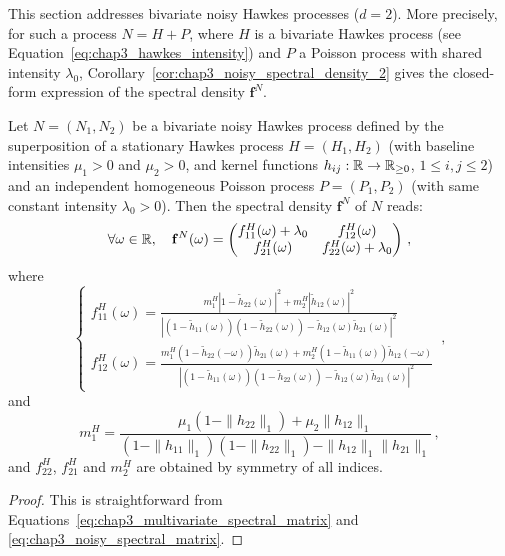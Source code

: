       This section addresses bivariate noisy Hawkes processes ($d=2$).
      More precisely, for such a process $N = H + P$, where $H$ is a bivariate Hawkes process (see Equation~\eqref{eq:chap3_hawkes_intensity}) and $P$ a Poisson process with shared intensity $\lambda_0$,
      Corollary~\ref{cor:chap3_noisy_spectral_density_2} gives the closed-form expression of the spectral density $\mathbf f^N$.
      \begin{corollary}\label{cor:chap3_noisy_spectral_density_2}
        Let $N = (N_1, N_2)$ be a bivariate noisy Hawkes process defined by the superposition of a stationary Hawkes process $H = (H_1, H_2)$
        (with baseline intensities $\mu_1 > 0$ and $\mu_2 > 0$, and kernel functions $h_{ij} : {\mathbb R} \to {\mathbb R}_{\geq 0}$, $1 \le i, j \le 2$)
        and an independent homogeneous Poisson process $P = (P_1, P_2)$ (with same constant intensity $\lambda_0 > 0$).
        Then the spectral density $\mathbf f^N$ of $N$ reads:
        \begin{equation*}
          \forall \omega \in {\mathbb R}, \quad
          \mathbf f^N(\omega) =
          \begin{pmatrix}
            f_{11}^H(\omega) + \lambda_0 & f_{12}^H(\omega) \\
            f_{21}^H(\omega) & f_{22}^H(\omega) + \lambda_0
          \end{pmatrix} \,,
        \end{equation*}
        where
        \[
          \begin{cases}
            f_{11}^H (\omega) = \frac{m_1^H \left \lvert 1 - \tilde h_{22}(\omega) \right \rvert^2 + m_2^H \left \lvert  \tilde h_{12}(\omega) \right \rvert^2}{\left \lvert \left (1-\tilde h_{11}(\omega) \right) \left (1-\tilde h_{22}(\omega) \right) - \tilde h_{12}(\omega) \tilde h_{21}(\omega) \right \rvert^2}\\
            f_{12}^H(\omega) = \frac{m_1^H \left (1-\tilde h_{22}(-\omega) \right)\tilde h_{21}(\omega) + m_2^H \left (1-\tilde h_{11}(\omega) \right) \tilde h_{12}(-\omega)}{\left \lvert \left (1-\tilde h_{11}(\omega) \right) \left (1-\tilde h_{22}(\omega) \right) - \tilde h_{12}(\omega) \tilde h_{21}(\omega) \right \rvert^2}
          \end{cases} \,,
        \]
        and
        \[
          m_1^H = \frac{\mu_1\left( 1 - \|h_{22}\|_1 \right)  + \mu_2 \|h_{12}\|_1 }{\left( 1 - \|h_{11}\|_1 \right)\left( 1 - \|h_{22}\|_1 \right) - \|h_{12}\|_1 \|h_{21}\|_1} \, ,
        \]
        and $f_{22}^H$, $f_{21}^H$ and $m_2^H$ are obtained by symmetry of all indices.
      \end{corollary}
      \begin{proof}
        This is straightforward from Equations~\eqref{eq:chap3_multivariate_spectral_matrix} and \eqref{eq:chap3_noisy_spectral_matrix}.
      \end{proof}
      
